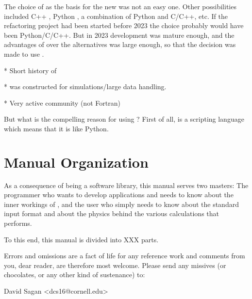 The choice of \julia as the basis for the new \bmad was not an easy one. Other possibilities included
C++ \cite{}, Python \cite{}, a combination of Python and C/C++, etc. If the \bmad refactoring
project had been started before 2023 the choice probably would have been Python/C/C++. But in
2023 \julia development was mature enough, and the advantages of \julia over the alternatives was
large enough, so that the decision was made to use \julia.

* Short history of \julia

* \julia was constructed for simulations/large data handling.

* Very active community (not Fortran)

But what is the compelling reason for using \julia? First of all, \julia is a scripting language which
means that it is 
like Python. 

\section{Manual Organization}

As a consequence of \bmad being a software library, this manual serves two masters: The
programmer who wants to develop applications and needs to know about the inner workings of
\bmad, and the user who simply needs to know about the \bmad standard input format and
about the physics behind the various calculations that \bmad performs.

To this end, this manual is divided into XXX parts. 

Errors and omissions are a fact of life for any
reference work and comments from you, dear reader, are therefore most welcome. Please send
any missives (or chocolates, or any other kind of sustenance) to:
\begin{example}
  David Sagan <dcs16@cornell.edu>
\end{example}

